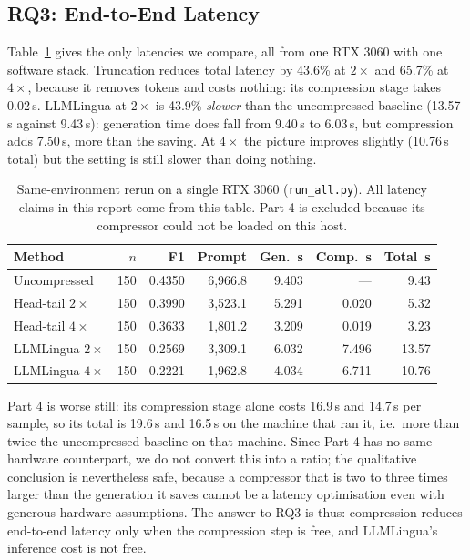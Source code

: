 \documentclass[10pt,a4paper,twocolumn]{article}
\begin{document}
\subsection{RQ3: End-to-End Latency}

Table~\ref{tab:rerun} gives the only latencies we compare, all from one RTX 3060
with one software stack. Truncation reduces total latency by 43.6\% at $2\times$
and 65.7\% at $4\times$, because it removes tokens and costs nothing: its
compression stage takes 0.02\,s. LLMLingua at $2\times$ is 43.9\% \emph{slower}
than the uncompressed baseline (13.57\,s against 9.43\,s): generation time does fall
from 9.40\,s to 6.03\,s, but compression adds 7.50\,s, more than the saving. At
$4\times$ the picture improves slightly (10.76\,s total) but the setting is still
slower than doing nothing.

\begin{table}[t]
\centering
\footnotesize
\setlength{\tabcolsep}{3.2pt}
\begin{tabular}{@{}lrrrrrr@{}}
\toprule
Method & $n$ & F1 & Prompt & Gen.\ s & Comp.\ s & Total\ s \\
\midrule
Uncompressed        & 150 & 0.4350 & 6{,}966.8 & 9.403 & ---    & 9.43 \\
Head-tail $2\times$ & 150 & 0.3990 & 3{,}523.1 & 5.291 & 0.020  & 5.32 \\
Head-tail $4\times$ & 150 & 0.3633 & 1{,}801.2 & 3.209 & 0.019  & 3.23 \\
LLMLingua $2\times$ & 150 & 0.2569 & 3{,}309.1 & 6.032 & 7.496  & 13.57 \\
LLMLingua $4\times$ & 150 & 0.2221 & 1{,}962.8 & 4.034 & 6.711  & 10.76 \\
\bottomrule
\end{tabular}
\caption{Same-environment rerun on a single RTX 3060 (\texttt{run\_all.py}). All
latency claims in this report come from this table. Part 4 is excluded because its
compressor could not be loaded on this host.}
\label{tab:rerun}
\end{table}

Part 4 is worse still: its compression stage alone costs 16.9\,s and 14.7\,s per
sample, so its total is 19.6\,s and 16.5\,s on the machine that ran it, i.e.\ more
than twice the uncompressed baseline on that machine. Since Part 4 has no
same-hardware counterpart, we do not convert this into a ratio; the qualitative
conclusion is nevertheless safe, because a compressor that is two to three times
larger than the generation it saves cannot be a latency optimisation even with
generous hardware assumptions. The answer to RQ3 is thus: compression reduces
end-to-end latency only when the compression step is free, and LLMLingua's
inference cost is not free.
\end{document}
